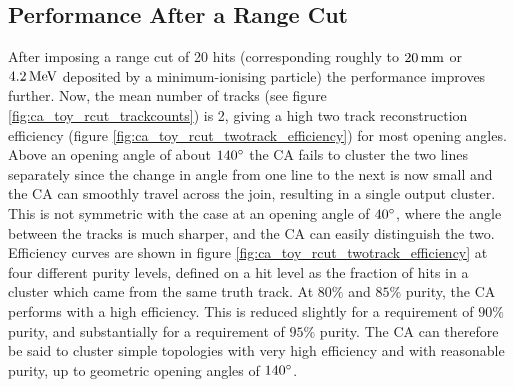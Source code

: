 
\subsection{Performance After a Range Cut}
After imposing a range cut of 20 hits (corresponding roughly to $20\,\mathrm{mm}$ or $4.2\,\mathrm{MeV}$ deposited by a minimum-ionising particle) the performance improves further. Now, the mean number of tracks (see figure \ref{fig:ca_toy_rcut_trackcounts}) is 2, giving a high two track reconstruction efficiency (figure \ref{fig:ca_toy_rcut_twotrack_efficiency}) for most opening angles. Above an opening angle of about $140^\circ$ the \ac{CA} fails to cluster the two lines separately since the change in angle from one line to the next is now small and the \ac{CA} can smoothly travel across the join, resulting in a single output cluster. This is not symmetric with the case at an opening angle of $40^\circ$, where the angle between the tracks is much sharper, and the \ac{CA} can easily distinguish the two. Efficiency curves are shown in figure \ref{fig:ca_toy_rcut_twotrack_efficiency} at four different purity levels, defined on a hit level as the fraction of hits in a cluster which came from the same truth track. At $80\%$ and $85\%$ purity, the \ac{CA} performs with a high efficiency. This is reduced slightly for a requirement of $90\%$ purity, and substantially for a requirement of $95\%$ purity. The \ac{CA} can therefore be said to cluster simple topologies with very high efficiency and with reasonable purity, up to geometric opening angles of $140^\circ$.

